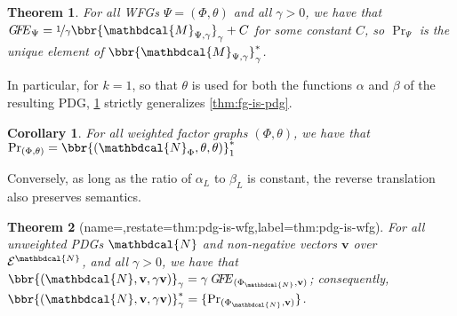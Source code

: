 \documentclass[letterpaper]{article} %
\theoremstyle{plain}
\newtheorem{theorem}{Theorem}[section]
\newtheorem{coro}{Corollary}[theorem]
\theoremstyle{definition}
\theoremstyle{remark}
\newcommand{\begthm}[3][]{\begin{#2}[{name=#1},restate=#3,label=#3]}
\newcommand\mat[1]{\mathbf{#1}}
\newcommand{\Ed}{\mathcal E}
\newcommand{\dg}[1]{\mathbdcal{#1}}
\newcommand{\UPDGof}[1]{{\dg N}_{#1}}
\newcommand\GFE{\mathit{G\mkern-4mu F\mkern-4.5mu E}}
\begin{document}
\begin{theorem}\label{thm:wfg-is-pdg}
For all WFGs $\Psi = (\Phi,\theta)$ and all $\gamma > 0$,
we have that
$\GFE_\Psi
= \nicefrac1{\gamma} \bbr{{\dg M}_{\Psi,\gamma}}_{\gamma} 
+ C$   
for some constant $C$, so
$\Pr_{\Psi}$ is the unique element of
$\bbr{{\dg M}_{\Psi,\gamma}}_{\gamma}^*$.
\end{theorem}

In particular, for $k\!=\!1$, so that $\theta$ is used for both the functions
$\alpha$ and $\beta$ of the resulting PDG,
\cref{thm:wfg-is-pdg} strictly generalizes \cref{thm:fg-is-pdg}.
\begin{coro}
	For all weighted factor graphs $(\Phi, \theta)$,
	we have that
	$\Pr_{(\Phi,\theta)} = \bbr{(\UPDGof{\Phi}, \theta,\theta)}_1^*$
\end{coro}

Conversely, as long as the ratio of $\alpha_L$ to $\beta_L$ is constant, the
reverse translation also preserves semantics.
\begthm{theorem}{thm:pdg-is-wfg}
For all unweighted PDGs $\dg{N}$ and non-negative vectors $\mat v$
over $\Ed^{\dg N}$, and all $\gamma > 0$, we have that 
$\bbr{(\dg N, \mat v, \gamma \mat v)}_{\gamma}
= \gamma\,\GFE_{(\Phi_{\dg N}, \mat v)} $; consequently,
$\bbr{(\dg N,  \mat v,  \gamma\mat v)}_{\gamma}^*
		= \{\Pr_{(\Phi_{\dg N}, \mat v)} \}$. 
\end{theorem}
\end{document}
